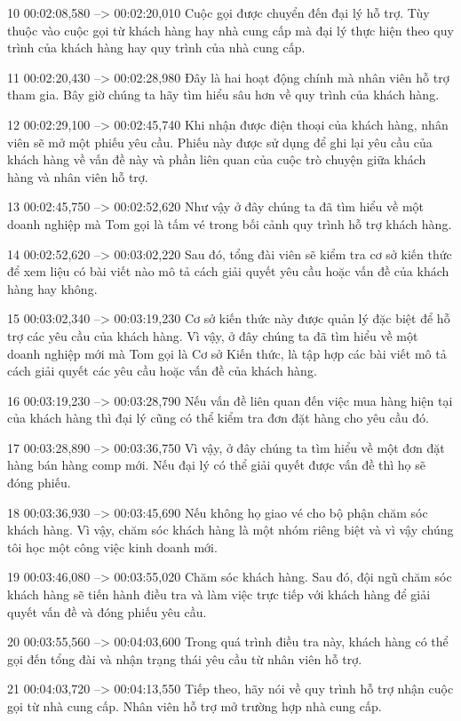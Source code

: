 10
00:02:08,580 --> 00:02:20,010
Cuộc gọi được chuyển đến đại lý hỗ trợ.  Tùy thuộc vào cuộc gọi từ khách hàng hay nhà cung cấp mà đại lý thực hiện theo quy trình của khách hàng hay quy trình của nhà cung cấp.

11
00:02:20,430 --> 00:02:28,980
Đây là hai hoạt động chính mà nhân viên hỗ trợ tham gia. Bây giờ chúng ta hãy tìm hiểu sâu hơn về quy trình của khách hàng.

12
00:02:29,100 --> 00:02:45,740
Khi nhận được điện thoại của khách hàng, nhân viên sẽ mở một phiếu yêu cầu.  Phiếu này được sử dụng để ghi lại yêu cầu của khách hàng về vấn đề này và phần liên quan của cuộc trò chuyện giữa khách hàng và nhân viên hỗ trợ.

13
00:02:45,750 --> 00:02:52,620
Như vậy ở đây chúng ta đã tìm hiểu về một doanh nghiệp mà Tom gọi là tấm vé trong bối cảnh quy trình hỗ trợ khách hàng.

14
00:02:52,620 --> 00:03:02,220
Sau đó, tổng đài viên sẽ kiểm tra cơ sở kiến ​​thức để xem liệu có bài viết nào mô tả cách giải quyết yêu cầu hoặc vấn đề của khách hàng hay không.

15
00:03:02,340 --> 00:03:19,230
Cơ sở kiến ​​thức này được quản lý đặc biệt để hỗ trợ các yêu cầu của khách hàng.  Vì vậy, ở đây chúng ta đã tìm hiểu về một doanh nghiệp mới mà Tom gọi là Cơ sở Kiến thức, là tập hợp các bài viết mô tả cách giải quyết các yêu cầu hoặc vấn đề của khách hàng.

16
00:03:19,230 --> 00:03:28,790
Nếu vấn đề liên quan đến việc mua hàng hiện tại của khách hàng thì đại lý cũng có thể kiểm tra đơn đặt hàng cho yêu cầu đó.

17
00:03:28,890 --> 00:03:36,750
Vì vậy, ở đây chúng ta tìm hiểu về một đơn đặt hàng bán hàng comp mới.  Nếu đại lý có thể giải quyết được vấn đề thì họ sẽ đóng phiếu.

18
00:03:36,930 --> 00:03:45,690
Nếu không họ giao vé cho bộ phận chăm sóc khách hàng.  Vì vậy, chăm sóc khách hàng là một nhóm riêng biệt và vì vậy chúng tôi học một công việc kinh doanh mới.

19
00:03:46,080 --> 00:03:55,020
Chăm sóc khách hàng.  Sau đó, đội ngũ chăm sóc khách hàng sẽ tiến hành điều tra và làm việc trực tiếp với khách hàng để giải quyết vấn đề và đóng phiếu yêu cầu.

20
00:03:55,560 --> 00:04:03,600
Trong quá trình điều tra này, khách hàng có thể gọi đến tổng đài và nhận trạng thái yêu cầu từ nhân viên hỗ trợ.

21
00:04:03,720 --> 00:04:13,550
Tiếp theo, hãy nói về quy trình hỗ trợ nhận cuộc gọi từ nhà cung cấp.  Nhân viên hỗ trợ mở trường hợp nhà cung cấp.

